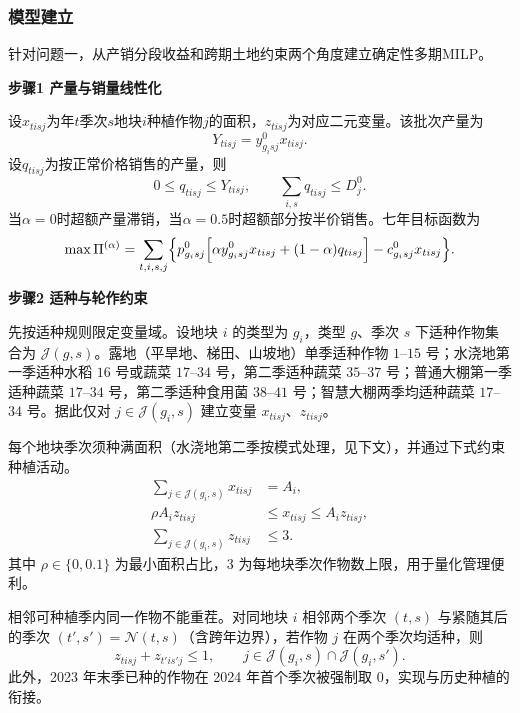 \subsubsection{模型建立}

针对问题一，从产销分段收益和跨期土地约束两个角度建立确定性多期MILP。

\textbf{步骤1 产量与销量线性化}

设$x_{tisj}$为年$t$季次$s$地块$i$种植作物$j$的面积，$z_{tisj}$为对应二元变量。该批次产量为
\begin{equation}
Y_{tisj}=y^0_{g_i s j}x_{tisj}.
\end{equation}
设$q_{tisj}$为按正常价格销售的产量，则
\begin{equation}
0\le q_{tisj}\le Y_{tisj},\qquad
\sum_{i,s}q_{tisj}\le D_j^0.
\end{equation}
当$\alpha=0$时超额产量滞销，当$\alpha=0.5$时超额部分按半价销售。七年目标函数为
\begin{equation}
\max \Pi^{(\alpha)}=
\sum_{t,i,s,j}\Bigl\{p^0_{g_i s j}\Bigl[\alpha y^0_{g_i s j}x_{tisj}+(1-\alpha)q_{tisj}\Bigr]-c^0_{g_i s j}x_{tisj}\Bigr\}.
\end{equation}

\textbf{步骤2 适种与轮作约束}

先按适种规则限定变量域。设地块 $i$ 的类型为 $g_i$，类型 $g$、季次 $s$ 下适种作物集合为 $\mathcal{J}(g,s)$。露地（平旱地、梯田、山坡地）单季适种作物 $1$--$15$ 号；水浇地第一季适种水稻 $16$ 号或蔬菜 $17$--$34$ 号，第二季适种蔬菜 $35$--$37$ 号；普通大棚第一季适种蔬菜 $17$--$34$ 号，第二季适种食用菌 $38$--$41$ 号；智慧大棚两季均适种蔬菜 $17$--$34$ 号。据此仅对 $j\in\mathcal{J}(g_i,s)$ 建立变量 $x_{tisj}$、$z_{tisj}$。

每个地块季次须种满面积（水浇地第二季按模式处理，见下文），并通过下式约束种植活动。
\begin{align}
\sum_{j\in\mathcal{J}(g_i,s)}x_{tisj}&=A_i,\\
\rho A_i z_{tisj}&\le x_{tisj}\le A_i z_{tisj},\\
\sum_{j\in\mathcal{J}(g_i,s)}z_{tisj}&\le3.
\end{align}
其中 $\rho\in\{0,0.1\}$ 为最小面积占比，$3$ 为每地块季次作物数上限，用于量化管理便利。

相邻可种植季内同一作物不能重茬。对同地块 $i$ 相邻两个季次 $(t,s)$ 与紧随其后的季次 $(t',s')=\mathcal{N}(t,s)$（含跨年边界），若作物 $j$ 在两个季次均适种，则
\begin{equation}
z_{tisj}+z_{t'is'j}\le1,\qquad j\in\mathcal{J}(g_i,s)\cap\mathcal{J}(g_i,s').
\end{equation}
此外，2023 年末季已种的作物在 2024 年首个季次被强制取 $0$，实现与历史种植的衔接。

